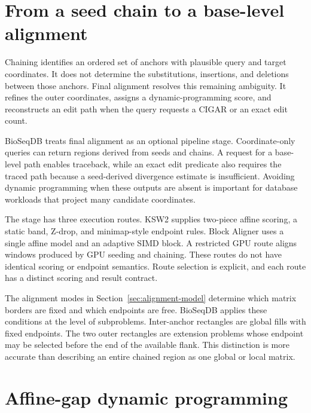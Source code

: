 \section{From a seed chain to a base-level alignment}
\label{sec:final-alignment-role}

Chaining identifies an ordered set of anchors with plausible query and target
coordinates. It does not determine the substitutions, insertions, and
deletions between those anchors. Final alignment resolves this remaining
ambiguity. It refines the outer coordinates, assigns a dynamic-programming
score, and reconstructs an edit path when the query requests a CIGAR or an
exact edit count.

BioSeqDB treats final alignment as an optional pipeline stage. Coordinate-only
queries can return regions derived from seeds and chains. A request for a
base-level path enables traceback, while an exact edit predicate also requires
the traced path because a seed-derived divergence estimate is insufficient.
Avoiding dynamic programming when these outputs are absent is important for
database workloads that project many candidate coordinates.

The stage has three execution routes. KSW2 supplies two-piece affine scoring,
a static band, Z-drop, and minimap-style endpoint rules. Block Aligner uses a
single affine model and an adaptive SIMD block. A restricted GPU route aligns
windows produced by GPU seeding and chaining. These routes do not have
identical scoring or endpoint semantics. Route selection is explicit, and
each route has a distinct scoring and result contract.

The alignment modes in Section~\ref{sec:alignment-model} determine which
matrix borders are fixed and which endpoints are free. BioSeqDB applies these
conditions at the level of subproblems. Inter-anchor rectangles are global
fills with fixed endpoints. The two outer rectangles are extension problems
whose endpoint may be selected before the end of the available flank. This
distinction is more accurate than describing an entire chained region as one
global or local matrix.

\section{Affine-gap dynamic programming}
\label{sec:final-alignment-affine}

